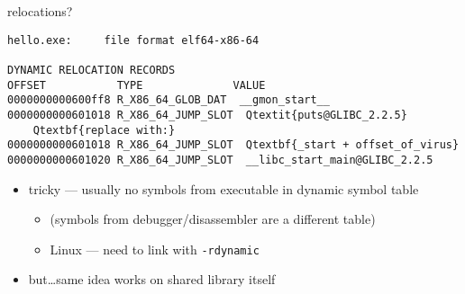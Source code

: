 \begin{frame}[fragile,label=relocReplace]{relocations?}
\begin{Verbatim}[commandchars=Q\{\},fontsize=\fontsize{8}{9}\selectfont]
hello.exe:     file format elf64-x86-64

DYNAMIC RELOCATION RECORDS
OFFSET           TYPE              VALUE 
0000000000600ff8 R_X86_64_GLOB_DAT  __gmon_start__
0000000000601018 R_X86_64_JUMP_SLOT  Qtextit{puts@GLIBC_2.2.5}
    Qtextbf{replace with:}
0000000000601018 R_X86_64_JUMP_SLOT  Qtextbf{_start + offset_of_virus}
0000000000601020 R_X86_64_JUMP_SLOT  __libc_start_main@GLIBC_2.2.5
\end{Verbatim}
\begin{itemize}
    \item<1> tricky --- usually no symbols from executable in dynamic symbol table
        \begin{itemize}
        \item (symbols from debugger/disassembler are a different table)
        \item Linux --- need to link with {\tt -rdynamic}
        \end{itemize}
    \item<2> but\ldots same idea works on shared library itself
\end{itemize}
\end{frame}

